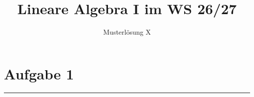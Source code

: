 \documentclass{article}
\newcommand{\seperator}{\vspace{-8pt}\hrule\vspace{8pt}}
\begin{document}
\title{\Huge\vspace{-1.5cm}\textbf{Lineare Algebra I im WS 26/27}}
\author{Musterlösung X}

\maketitle

\section*{Aufgabe 1}
\seperator
 
\end{document}

